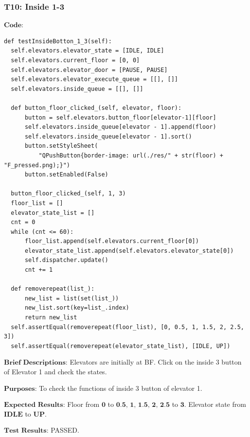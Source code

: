 \documentclass{article}
\begin{document}
\subsubsection*{T10: Inside 1-3}
$\textbf{Code:}$
\begin{lstlisting}
def testInsideBotton_1_3(self):
  self.elevators.elevator_state = [IDLE, IDLE]
  self.elevators.current_floor = [0, 0]
  self.elevators.elevator_door = [PAUSE, PAUSE]
  self.elevators.elevator_execute_queue = [[], []]
  self.elevators.inside_queue = [[], []]

  def button_floor_clicked_(self, elevator, floor):
      button = self.elevators.button_floor[elevator-1][floor]
      self.elevators.inside_queue[elevator - 1].append(floor)
      self.elevators.inside_queue[elevator - 1].sort()
      button.setStyleSheet(
          "QPushButton{border-image: url(./res/" + str(floor) + "F_pressed.png);}")
      button.setEnabled(False)

  button_floor_clicked_(self, 1, 3)
  floor_list = []
  elevator_state_list = []
  cnt = 0
  while (cnt <= 60):
      floor_list.append(self.elevators.current_floor[0])
      elevator_state_list.append(self.elevators.elevator_state[0])
      self.dispatcher.update()
      cnt += 1

  def removerepeat(list_):
      new_list = list(set(list_))
      new_list.sort(key=list_.index)
      return new_list
  self.assertEqual(removerepeat(floor_list), [0, 0.5, 1, 1.5, 2, 2.5, 3])
  self.assertEqual(removerepeat(elevator_state_list), [IDLE, UP])
\end{lstlisting}

$\textbf{Brief Descriptions:}$
Elevators are initially at BF. Click on the inside 3 button of Elevator 1 and check the states.

$\textbf{Purposes:}$
To check the functions of inside 3 button of elevator 1.

$\textbf{Expected Results:}$
Floor from $\textbf{0}$ to $\textbf{0.5, 1, 1.5, 2, 2.5}$ to $\textbf{3}$. Elevator state from $\textbf{IDLE}$ to $\textbf{UP}$.

$\textbf{Test Results:}$
PASSED.
\end{document}
